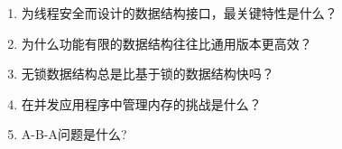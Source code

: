 \begin{enumerate}
\item 
为线程安全而设计的数据结构接口，最关键特性是什么？

\item 
为什么功能有限的数据结构往往比通用版本更高效？

\item 
无锁数据结构总是比基于锁的数据结构快吗？

\item
在并发应用程序中管理内存的挑战是什么？

\item
A-B-A问题是什么?
\end{enumerate}